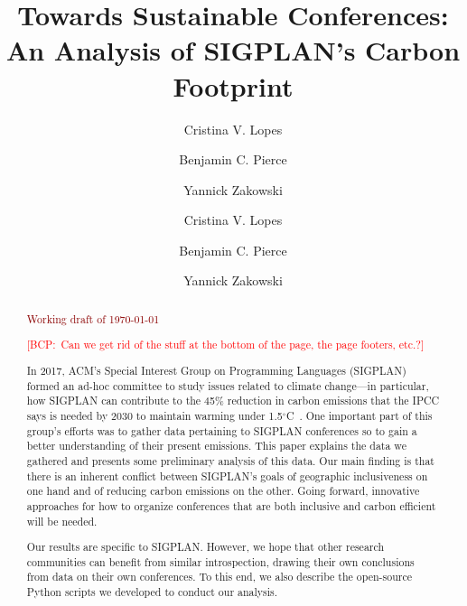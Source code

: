 \documentclass[screen,acmlarge]{acmart}
\title{Towards Sustainable Conferences: \\
An Analysis of SIGPLAN's Carbon Footprint}
\author{Cristina V. Lopes}
\affiliation{%
  \institution{University of California, Irvine}
  \city{Irvine}
  \state{CA}
  \postcode{92697}
  \country{USA}}
\author{Benjamin C. Pierce}
\affiliation{%
  \institution{University of Pennsylvania}
  \city{Philadelphia}
  \state{PA}
  \country{USA}}
\author{Yannick Zakowski}
\affiliation{%
  \institution{University of Pennsylvania}
  \city{Philadelphia}
  \state{PA}
  \country{USA}}
\author{Cristina V. Lopes \and Benjamin C. Pierce \and Yannick Zakowski}
\newif\ifcomments\commentstrue   %
\newcommand{\bcp}[1]{\textcolor{red}{{[BCP:~#1]}}}
\newcommand{\bcp}[1]{}
\newif\ifopinions\opinionstrue   %
\begin{document}
\maketitle

\begin{abstract}
\bigskip
\begin{center}
{\ifcomments\huge\textcolor{darkred}{Working draft of \today}\fi}
\end{center}
\bigskip
\ifacmstyle
\bcp{Can we get rid of the stuff at the bottom of the page, the page
  footers, etc.?}
\fi
\bigskip

\noindent In 2017, ACM's Special Interest Group on Programming Languages (SIGPLAN)
formed an ad-hoc committee to study issues related to climate change---in
particular, how SIGPLAN can contribute to the 45\% reduction in carbon
emissions that the IPCC says is needed by 2030 to maintain warming under
1.5$^{\circ}$C~\cite{IPCCReport}.
One important part of this group's efforts was
to gather data pertaining to SIGPLAN conferences so to gain a better
understanding of their present emissions. This paper explains the data we
gathered and presents some preliminary analysis of this data. Our main
finding is that there is an inherent conflict between SIGPLAN's goals of
geographic inclusiveness on one hand and of reducing carbon emissions on the
other. Going forward, innovative approaches for how to organize conferences
that are both inclusive and carbon efficient will be needed.

Our results are specific to SIGPLAN.  However, we hope that other research
communities can benefit from similar introspection, drawing their own
conclusions from data on their own conferences. To this end, we also
describe the open-source Python scripts we developed to conduct our
analysis.

\end{abstract}

\ifacmstyle
{}
\fi






\ifopinions\fi




\end{document}
